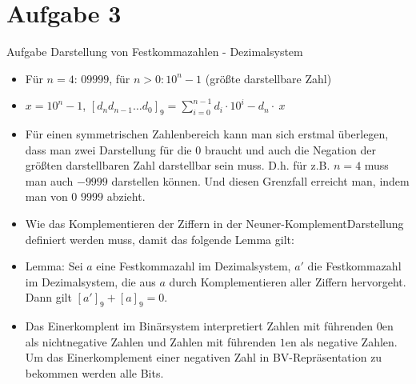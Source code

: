 
\section{Aufgabe 3}

\setcounter{exercise}{1}

\begin{frame}[allowframebreaks]{Aufgabe \thesection}{Darstellung von Festkommazahlen - Dezimalsystem}
  \begin{solution}
    \begin{itemize}
      \item Für $n=4$: $09999$, für $n>0: 10^n-1$ (\alert{größte darstellbare Zahl})
      \item $x=10^n-1$, $\displaystyle [d_{n}d_{n-1}\ldots d_{0}]_9=\sum_{i=0}^{n-1}d_{i}\cdot 10^{i}-d_{n}\cdot\ x$
      \item Für einen symmetrischen Zahlenbereich kann man sich erstmal überlegen, dass man zwei Darstellung für die $0$ braucht und auch die Negation der größten darstellbaren Zahl darstellbar sein muss. D.h. für z.B. $n = 4$ muss man auch $-9999$ darstellen können. Und diesen Grenzfall erreicht man, indem man von $0$ $9999$ abzieht.
    \end{itemize}
  \end{solution}
  \begin{exercisenoinc}
    \begin{itemize}
      \item Wie das \alert{Komplementieren} der Ziffern in der \alert{Neuner-KomplementDarstellung} definiert werden muss, damit das folgende Lemma gilt:
      \item \alert{Lemma:} Sei $a$ eine Festkommazahl im Dezimalsystem, $a'$ die Festkommazahl im Dezimalsystem, die aus $a$ durch Komplementieren aller Ziffern hervorgeht. Dann gilt $[a']_9 + [a]_9 = 0$.
    \end{itemize}
  \end{exercisenoinc}
  \begin{solution}
    \begin{itemize}
      \item Das Einerkomplent im Binärsystem interpretiert Zahlen mit führenden $0$en als nichtnegative Zahlen und Zahlen
mit führenden $1$en als negative Zahlen. Um das Einerkomplement einer negativen Zahl in BV-Repräsentation zu bekommen werden alle Bits.

\end{itemize}
\end{solution}
\end{frame}
